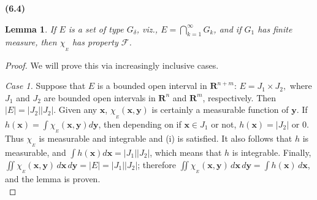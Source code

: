 \documentclass[12pt]{book}
\renewcommand{\vec}[1]{\mathbf{#1}}
\renewcommand{\cal}[1]{\mathscr{#1}}
\newcommand{\bi}{\bigcap}
\newcommand{\cross}{\times}
\newcommand{\ind}[1]{\chi_{_{#1}}}
\newcommand{\R}{\mathbf{R}}
\renewcommand{\.}{\mkern1mu}
\newcounter{case}
\newcommand{\abs}[1]{\left| #1 \right|}
\newenvironment{pf}{\begin{proof}\setlength{\parindent}{\normalparindent}\setlength{\parskip}{\normalparskip}}{\end{proof}}
\theoremstyle{theorem}
\newtheorem{lemma}{Lemma}
\newcommand{\thmindent}{\setlength{\parindent}{17pt}}
\newenvironment{lem}[1]
	{\noindent \textbf{#1}\hspace{2ex}\begin{minipage}[t]{\linewidth - \widthof{\textbf{(#1)}}}\begin{lemma}\thmindent }
	{\end{lemma}\end{minipage}\medskip}
\newlength{\normalparindent}
\newlength{\normalparskip}
\begin{document}
	\begin{lem}{(6.4)}
		If $E$ is a set of type $G_\delta$, viz., $E=\bi_{k=1}^\infty G_k$, and if $G_1$ has finite measure, then $\ind E$ has property $\cal{F}$.
	\end{lem}
		\begin{pf}
			We will prove this via increasingly inclusive cases.
			
			\textit{Case 1.} Suppose that $E$ is a bounded open interval in $\R^{n+m}$: $E= J_1 \cross J_2,$ where $J_1$ and $J_2$ are bounded open intervals in $\R^n$ and $\R^m$, respectively. Then $\abs{E} =  \abs{J_2}\abs{J_2}$. Given any $\vec x$, $\ind E(\vec x, \vec y)$ is certainly a measurable function of $\vec y$. If $h(\vec x) = \int\ind E(\vec x, \vec y) d\vec y$, then depending on if $\vec x\in J_1$ or not, $h(\vec x) = \abs{J_2}$ or 0. Thus $\ind E$ is measurable and integrable and (i) is satisfied. It also follows that $h$ is measurable, and $\int h(\vec x) d\vec x = \abs{J_1}\abs{J_2}$, which means that $h$ is integrable. Finally, $\iint \ind E (\vec x, \vec y)\, d\vec x\, d\vec y = \abs{E} = \abs{J_1}\abs{J_2}$; therefore $\iint \ind E(\vec x, \vec y)\, d\vec x\, d\vec y = \int h(\vec x)\, d\vec x$, and the lemma is proven.\\
			

\end{pf}
\end{document}
